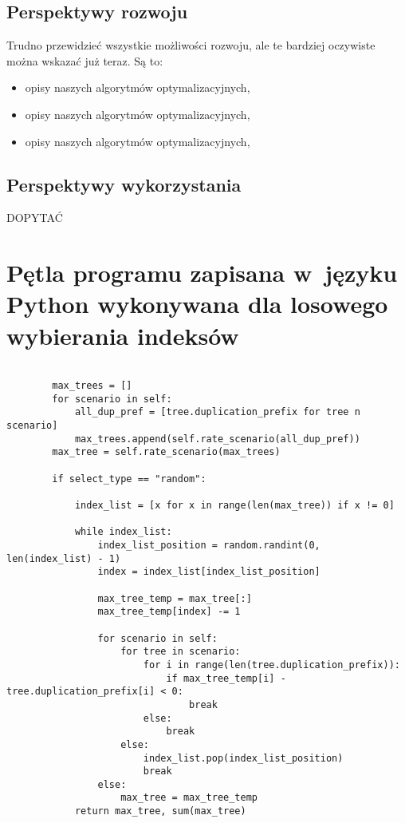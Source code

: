 \documentclass[licencjacka]{pracamgr}
\begin{document}
\section{Perspektywy rozwoju}


Trudno przewidzieć wszystkie możliwości rozwoju, ale te bardziej
oczywiste można wskazać już teraz.  Są to:
\begin{itemize}
\item opisy naszych algorytmów optymalizacyjnych,
\item opisy naszych algorytmów optymalizacyjnych,
\item opisy naszych algorytmów optymalizacyjnych,
\end{itemize}

\section{Perspektywy wykorzystania}

DOPYTAĆ

\appendix

\chapter{Pętla programu zapisana w~języku Python wykonywana dla losowego wybierania indeksów}

\begin{verbatim}

		max_trees = []
        for scenario in self:
            all_dup_pref = [tree.duplication_prefix for tree n scenario]
            max_trees.append(self.rate_scenario(all_dup_pref))
        max_tree = self.rate_scenario(max_trees)

        if select_type == "random":

            index_list = [x for x in range(len(max_tree)) if x != 0]

            while index_list:
                index_list_position = random.randint(0, len(index_list) - 1)
                index = index_list[index_list_position]

                max_tree_temp = max_tree[:]
                max_tree_temp[index] -= 1

                for scenario in self:
                    for tree in scenario:
                        for i in range(len(tree.duplication_prefix)):
                            if max_tree_temp[i] - tree.duplication_prefix[i] < 0:
                                break
                        else:
                            break
                    else:
                        index_list.pop(index_list_position)
                        break
                else:
                    max_tree = max_tree_temp
            return max_tree, sum(max_tree)
\end{verbatim}
\end{document}
